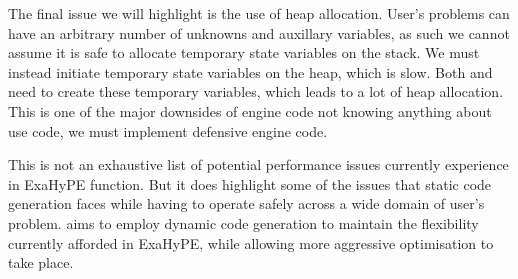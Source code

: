The final issue we will highlight is the use of heap allocation.
User's problems can have an arbitrary number of unknowns and auxillary variables, 
as such we cannot assume it is safe to allocate temporary state variables on the stack.
We must instead initiate temporary state variables on the heap, which is slow.
Both  and  need to create these temporary variables, which leads to a lot of heap allocation.
This is one of the major downsides of engine code not knowing anything about use code, we must implement defensive engine code.


This is not an exhaustive list of potential performance issues currently experience in ExaHyPE  function.
But it does highlight some of the issues that static code generation faces while having to operate safely across a wide domain of user's problem.
\phlat aims to employ dynamic code generation to maintain the flexibility currently afforded in ExaHyPE, while allowing more aggressive optimisation to take place.
